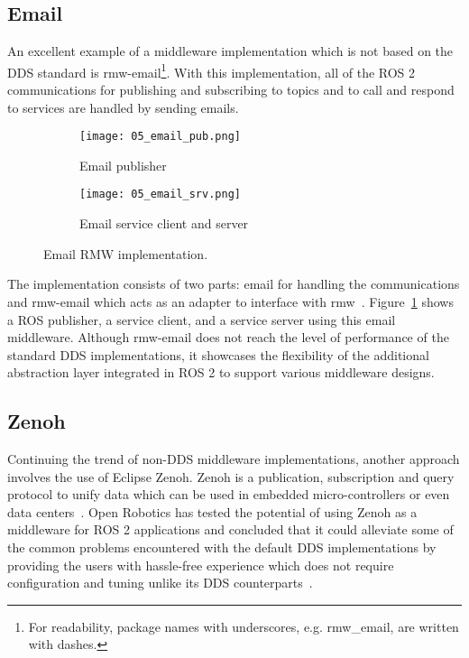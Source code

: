     \subsection{Email}

        An excellent example of a middleware implementation which is not based on the \ac{DDS} standard is \textsf{rmw-email}\footnote{For readability, package names with underscores, e.g. \textsf{rmw\_email}, are written with dashes.}. With this implementation, all of the \ac{ROS} 2 communications for publishing and subscribing to topics and to call and respond to services are handled by sending emails. 

        \begin{figure}[htbp]
            \centering
            \begin{subfigure}[t]{0.49\textwidth}
                \texttt{[image: 05\_email\_pub.png]}
                \caption{Email publisher}
            \end{subfigure}
            \begin{subfigure}[t]{0.49\textwidth}
                \texttt{[image: 05\_email\_srv.png]}
                \caption{Email service client and server}
            \end{subfigure}
            \vspace{1em}
            \caption{Email \ac{RMW} implementation.}
            \label{fig:email}
        \end{figure}

        The implementation consists of two parts: \textsf{email} for handling the communications and \textsf{rmw-email} which acts as an adapter to interface with \textsf{rmw}~\cite{emailblog}. Figure~\ref{fig:email} shows a \ac{ROS} publisher, a service client, and a service server using this \textsf{email} middleware. Although \textsf{rmw-email} does not reach the level of performance of the standard \ac{DDS} implementations, it showcases the flexibility of the additional abstraction layer integrated in \ac{ROS} 2 to support various middleware designs.


    \subsection{Zenoh}

        Continuing the trend of non-\ac{DDS} middleware implementations, another approach involves the use of Eclipse Zenoh. Zenoh is a publication, subscription and query protocol to unify data which can be used in embedded micro-controllers or even data centers~\cite{zenoh}. Open Robotics has tested the potential of using Zenoh as a middleware for ROS 2 applications and concluded that it could alleviate some of the common problems encountered with the default \ac{DDS} implementations by providing the users with hassle-free experience which does not require configuration and tuning unlike its \ac{DDS} counterparts~\cite{ros2zenoh}.

